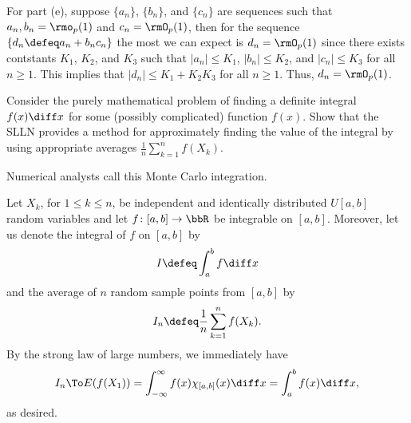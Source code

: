 \begin{solution}
  For part (e), suppose \(\{a_n\}\), \(\{b_n\}\), and \(\{c_n\}\) are
  sequences such that \(a_n,b_n=\rmo_p(1)\) and \(c_n=\rmO_p(1)\), then for
  the sequence \(\{d_n\defeq a_n+b_nc_n\}\) the most we can expect is
  \(d_n=\rmO_p(1)\) since there exists contstants \(K_1\), \(K_2\), and
  \(K_3\) such that \(|a_n|\leq K_1\), \(|b_n|\leq K_2\), and
  \(|c_n|\leq K_3\) for all \(n\geq 1\). This implies that
  \(|d_n|\leq K_1+K_2K_3\) for all \(n\geq 1\). Thus, \(d_n=\rmO_p(1)\).
\end{solution}
\newpage

\begin{problem}
  Consider the purely mathematical problem of finding a definite integral
  \(f(x)\diff x\) for some (possibly complicated) function \(f(x)\). Show
  that the SLLN provides a method for approximately finding the value of
  the integral by using appropriate averages
  \(\frac{1}{n}\sum_{k=1}^n f(X_k)\).

  Numerical analysts call this Monte Carlo integration.
\end{problem}
\begin{solution}
  Let \(X_k\), for \(1\leq k\leq n\), be independent and identically
  distributed \(U[a,b]\) random variables and let \(f\colon[a,b]\to\bbR\)
  be integrable on \([a,b]\). Moreover, let us denote the integral of \(f\)
  on \([a,b]\) by
  \[
    I\defeq\int_a^b f\diff x
  \]
  and the average of \(n\) random sample points from \([a,b]\) by
  \[
    I_n\defeq\frac{1}{n}\sum_{k=1}^n f(X_k).
  \]
  By the strong law of large numbers, we immediately have
  \[
    I_n\To E(f(X_1))=\int_{-\infty}^\infty f(x)\chi_{[a,b]}(x)\diff
    x=\int_a^b f(x)\diff x,
  \]
  as desired.
\end{solution}
\newpage

